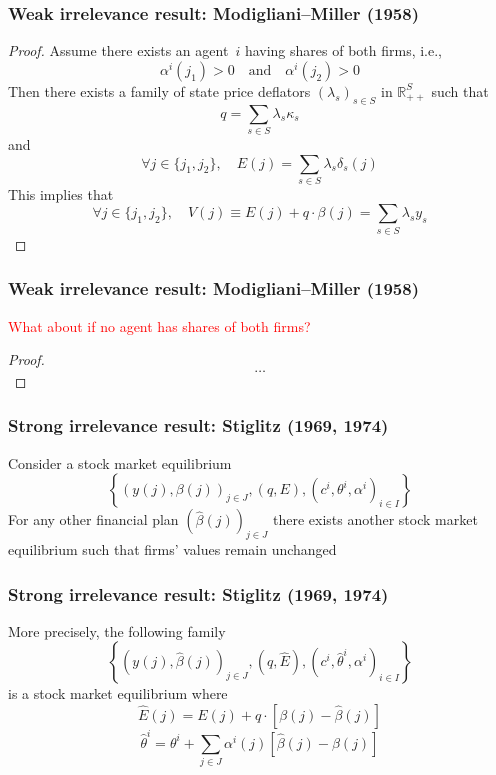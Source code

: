 \documentclass[blue]{beamer}
\def\R{\mathbb{R}}
\def\et{\quad \textrm{and} \quad}
\theoremstyle{definition}
\theoremstyle{example}
\begin{document}

\begin{frame}\frametitle{Weak irrelevance result: Modigliani--Miller (1958)}

\begin{small}
\begin{proof}
Assume there exists an agent~$i$ having shares of both firms, i.e.,
\[
\alpha^i(j_1) >0 \et \alpha^i(j_2) >0
\]
Then there exists a family of state price deflators $(\lambda_s)_{s\in S}$ in $\R^S_{++}$ such that
\[
q = \sum_{s\in S} \lambda_s \kappa_s
\]
and
\[
\forall j\in \{j_1,j_2\},\quad E(j) = \sum_{s\in S} \lambda_s \delta_s(j)
\]
This implies that
\[
\forall j\in \{j_1,j_2\},\quad V(j) \equiv E(j) + q \cdot \beta(j) = \sum_{s\in S} \lambda_s y_s
\]
\end{proof}
\end{small}


\end{frame}



\begin{frame}\frametitle{Weak irrelevance result: Modigliani--Miller (1958)}

\textcolor{red}{What about if no agent has shares of both firms?}

\begin{proof}
\[
\ldots
\]
\end{proof}

\end{frame}


\begin{frame}\frametitle{Strong irrelevance result: Stiglitz (1969, 1974)}
\begin{theorem}
Consider a stock market equilibrium
\[
\left\{ (y(j),\beta(j))_{j\in J}, (q,E), (c^i,\theta^i,\alpha^i)_{i\in I}\right\}
\]
For any other financial plan $(\widehat{\beta}(j))_{j\in J}$ there exists another stock market equilibrium such that firms' values remain unchanged
\end{theorem}

\end{frame}


\begin{frame}\frametitle{Strong irrelevance result: Stiglitz (1969, 1974)}
More precisely, the following family
\[
\left\{ (y(j),\widehat{\beta}(j))_{j\in J}, (q,\widehat{E}), (c^i,\widehat{\theta}^i,\alpha^i)_{i\in I}\right\}
\]
is a stock market equilibrium where
\[
\widehat{E}(j) = E(j) + q \cdot [\beta(j) - \widehat{\beta}(j)]
\]
\[
\widehat{\theta}^i = \theta^i + \sum_{j\in J} \alpha^i(j) [\widehat{\beta}(j) - \beta(j)]
\]
\end{frame}
\end{document}
